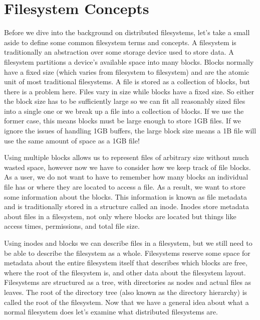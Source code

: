 \label{chapter:rel_work}


\section{Filesystem Concepts}

Before we dive into the background on distributed filesystems, let's take a small aside to define some common filesystem terms and concepts. A filesystem is traditionally an abstraction over some storage device used to store data. A filesystem partitions a device's available space into many blocks. Blocks normally have a fixed size (which varies from filesystem to filesystem) and are the atomic unit of most traditional filesystems. A file is stored as a collection of blocks, but there is a problem here. Files vary in size while blocks have a fixed size. So either the block size has to be sufficiently large so we can fit all reasonably sized files into a single one or we break up a file into a collection of blocks. If we use the former case, this means blocks must be large enough to store 1GB files. If we ignore the issues of handling 1GB buffers, the large block size means a 1B file will use the same amount of space as a 1GB file!

Using multiple blocks allows us to represent files of arbitrary size without much wasted space, however now we have to consider how we keep track of file blocks. As a user, we do not want to have to remember how many blocks an individual file has or where they are located to access a file. As a result, we want to store some information about the blocks. This information is known as file metadata and is traditionally stored in a structure called an inode. Inodes store metadata about files in a filesystem, not only where blocks are located but things like access times, permissions, and total file size. 

Using inodes and blocks we can describe files in a filesystem, but we still need to be able to describe the filesystem as a whole. Filesystems reserve some space for metadata about the entire filesystem itself that describes which blocks are free, where the root of the filesystem is, and other data about the filesystem layout. Filesystems are structured as a tree, with directories as nodes and actual files as leaves. The root of the directory tree (also known as the directory hierarchy) is called the root of the filesystem. Now that we have a general idea about what a normal filesystem does let's examine what distributed filesystems are. 


